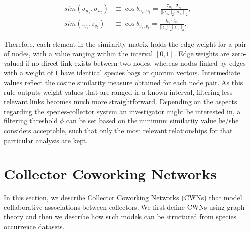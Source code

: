 {\begin{equation}
\label{equation:cosine_similarity}
\begin{split}
sim(\sigma_{u_s},\sigma_{u_t}) &\equiv
\cos \theta_{u_s,u_t} =
\frac{  \sigma_{u_s} \cdot \sigma_{u_t}  }{  ||\sigma_{u_s}||_2  ||\sigma_{u_t}||_2  }, \\
sim(\iota_{v_s},\iota_{v_t}) &\equiv
\cos \theta_{v_s,v_t} =
\frac{  \iota_{v_s} \cdot \iota_{v_t}  }{  ||\iota_{v_s}||_2  ||\iota_{v_t}||_2  }. 
\end{split}
\end{equation}

Therefore, each element in the similarity matrix holds the edge weight for a pair of nodes, with a value ranging within the interval $[0,1]$. Edge weights are zero-valued if no direct link exists between two nodes,  whereas nodes linked by edges with a weight of $1$ have identical species bags or quorum vectors. Intermediate values reflect the cosine similarity measure obtained for each node pair.
As this rule outputs weight values that are ranged in a known interval, filtering less relevant links becomes much more straightforward. Depending on the aspects regarding the species-collector system an investigator might be interested in, a filtering threshold $\phi$ can be set based on the minimum similarity value he/she considers acceptable, such that only the most relevant relationships for that particular analysis are kept.











%

\section{Collector Coworking Networks} \label{section:cwn}
In this section, we describe Collector Coworking Networks (CWNs) that model collaborative associations between collectors.
We first define CWNs using graph theory and then we describe how such models can be structured from species occurrence datasets.

}
